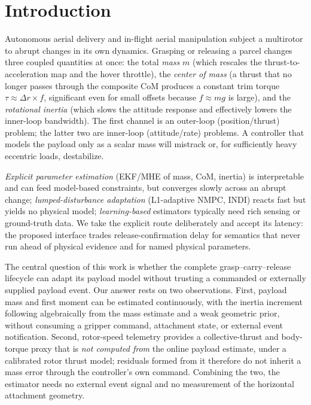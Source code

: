 \documentclass[conference]{IEEEtran}
\begin{document}
\section{Introduction}
Autonomous aerial delivery and in-flight aerial manipulation subject a multirotor to abrupt
changes in its own dynamics. Grasping or releasing a parcel changes three coupled quantities
at once: the total \emph{mass} $m$ (which rescales the thrust-to-acceleration map and the
hover throttle), the \emph{center of mass} (a thrust that no longer passes through the
composite CoM produces a constant trim torque $\tau \approx \Delta r \times f$, significant
even for small offsets because $f \approx mg$ is large), and the \emph{rotational inertia}
(which slows the attitude response and effectively lowers the inner-loop bandwidth). The
first channel is an outer-loop (position/thrust) problem; the latter two are inner-loop
(attitude/rate) problems. A controller that models the payload only as a scalar mass will
mistrack or, for sufficiently heavy eccentric loads, destabilize.

\emph{Explicit parameter estimation} (EKF/MHE of mass, CoM, inertia) is interpretable and can
feed model-based constraints, but converges slowly across an abrupt change;
\emph{lumped-disturbance adaptation} (L1-adaptive NMPC, INDI) reacts fast but yields no physical
model; \emph{learning-based} estimators typically need rich sensing or ground-truth data.
We take the explicit route deliberately and accept its latency: the proposed interface trades
release-confirmation delay for semantics that never run ahead of physical evidence and for
named physical parameters.

The central question of this work is whether the complete grasp--carry--release lifecycle can
adapt its payload model without trusting a commanded or externally supplied payload event.
Our answer rests on two observations. First, payload mass and first moment can be estimated
continuously, with the inertia increment following algebraically from the mass estimate and a
weak geometric prior, without consuming a gripper command, attachment state, or external
event notification. Second, rotor-speed telemetry provides a collective-thrust and body-torque
proxy that is \emph{not computed from} the online payload estimate, under a calibrated rotor
thrust model; residuals formed from it therefore do not inherit a mass error through the
controller's own command. Combining the two, the estimator needs no external event signal and
no measurement of the horizontal attachment geometry.
\end{document}
